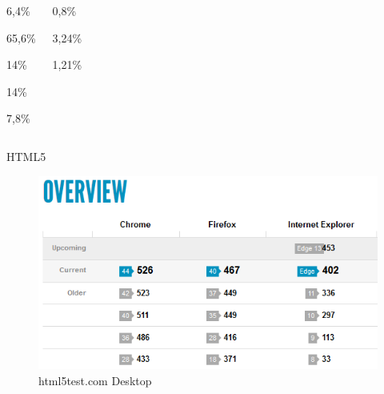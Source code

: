 \documentclass{beamer}
\begin{document}
		\begin{frame}
			\begin{columns}
				\begin{description}	
				
				\item<1->[Internet Explorer] 6,4\%
				\begin{description}
					\item<1-|alert@3>[IE 11] 65,6\%
					\item<1->[IE 10] 14\%
					\item<1->[IE 9] 14\%
					\item<1->[IE 8] 7,8\%
				\end{description}
				\end{description}
				\column{0.5\textwidth}
				\begin{description}
				\item<2-|alert@3>[Edge] 0,8\%
				\item<3-|alert@3>[Android Browser] 3,24\%
				\item<3-|alert@3>[MobileSafari] 1,21\%
			\end{description}
			\end{columns}
	\end{frame}
	\begin{frame}[t]{HTML5}
			\begin{figure}
\centering
\includegraphics[width=0.93\linewidth]{Bilder/HTML5Desktop}
\caption{html5test.com Desktop}
\label{fig:HTML5Desktop}
\end{figure}
	\end{frame}
\end{document}
